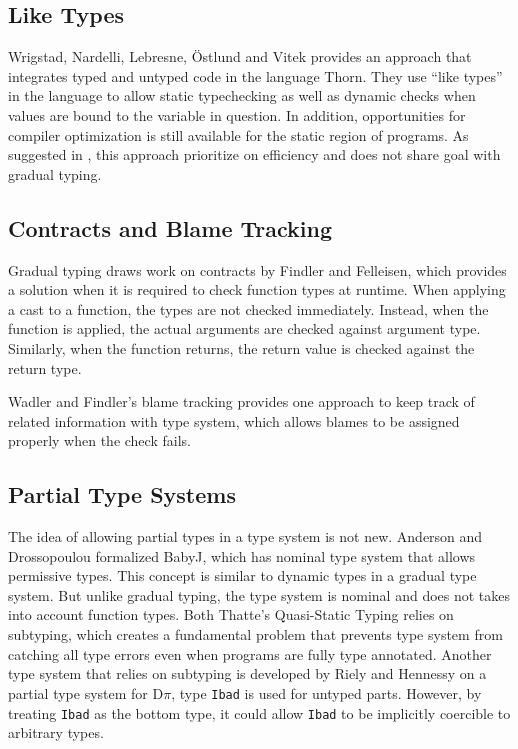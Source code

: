 \subsection{Like Types}

Wrigstad, Nardelli, Lebresne, {\"O}stlund and Vitek\cite{wrigstad2010integrating}
provides an approach that integrates typed and untyped code
in the language Thorn. They use ``like types'' in the language
to allow static typechecking as well as dynamic checks when
values are bound to the variable in question.
In addition, opportunities for compiler optimization
is still available for the static region of programs.
As suggested in \cite{siek2015refined}, this approach
prioritize on efficiency and does not share goal with gradual typing.

\subsection{Contracts and Blame Tracking}

Gradual typing draws work on contracts
by Findler and Felleisen\cite{findler2002contracts,gray2005fine},
which provides a solution when it is required to check function types at runtime.
When applying a cast to a function, the types are not checked immediately.
Instead, when the function is applied, the actual arguments are checked
against argument type. Similarly, when the function returns,
the return value is checked against the return type.

Wadler and Findler's blame tracking\cite{wadler2009well}
provides one approach to keep track of related information with type system,
which allows blames to be assigned properly when the check fails.

\subsection{Partial Type Systems}
The idea of allowing partial types in a type system is not new.
Anderson and Drossopoulou formalized BabyJ\cite{anderson2003babyj}, which has
nominal type system that allows permissive types.
This concept is similar to dynamic types in a gradual type system.
But unlike gradual typing, the type system is nominal and does not takes into account function types.
Both Thatte's Quasi-Static Typing\cite{thatte1989quasi} relies on subtyping,
which creates a fundamental problem that prevents type system from catching all type errors even when programs are
fully type annotated.
Another type system that relies on subtyping
is developed by Riely and Hennessy\cite{riely1999trust} on a partial type system for D$\pi$,
type \texttt{Ibad} is used for untyped parts. However, by treating \texttt{Ibad} as the bottom type,
it could allow \texttt{Ibad} to be implicitly coercible to arbitrary types.

